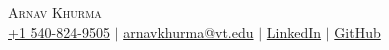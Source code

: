 \documentclass[letterpaper,10pt]{article}
\begin{document}

\begin{center}
    {\Huge \scshape Arnav Khurma} \\ \vspace{3.5pt}
    \href{tel:5408249505}{ {+1 540-824-9505}} $|$ \href{mailto:arnavkhurma@vt.edu}{ {arnavkhurma@vt.edu}} $|$ \href{https://www.linkedin.com/in/arnav-khurma/}{ {LinkedIn}} $|$
    \href{https://github.com/arnavkhurma}{ {GitHub}}
\end{center}

\end{document}
